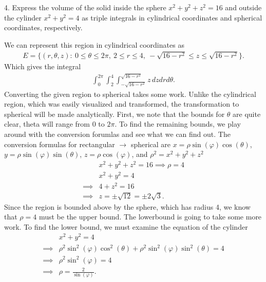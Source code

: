 \documentclass{report}
\begin{document}
    \bigbreak \noindent 
    \begin{mdframed}
        4. Express the volume of the solid inside the sphere \(x^2 + y^2 + z^2 = 16\) and outside the cylinder \(x^2 + y^2 = 4\) as triple integrals in cylindrical coordinates and spherical coordinates, respectively.
    \end{mdframed}
    \bigbreak \noindent 
    We can represent this region in cylindrical coordinates as
    \begin{align*}
        E = \{(r,\theta ,z):\ 0 \leq \theta \leq 2\pi,\ 2 \leq r \leq 4,\ -\sqrt{16-r^{2}} \leq z \leq \sqrt{16-r^{2}}\}
    .\end{align*}
    Which gives the integral
    \begin{align*}
        \int_{0}^{2\pi }\int_{2}^{4}\int_{-\sqrt{16-r^{2}}}^{\sqrt{16-r^{2}}}  z\,dzdrd\theta  
    .\end{align*}
    \bigbreak \noindent 
    Converting the given region to spherical takes some work. Unlike the cylindrical region, which was easily visualized and transformed, the transformation to spherical will be made analytically.
    \bigbreak \noindent 
    First, we note that the bounds for $\theta$ are quite clear, theta will range from $0$ to $2\pi$. To find the remaining bounds, we play around with the conversion forumlas and see what we can find out. The conversion formulas for rectangular $\rightarrow$ spherical are $x=\rho\sin{\left(\varphi\right)}\cos{\left(\theta \right)} $, $y=\rho\sin{\left(\varphi\right)}\sin{\left(\theta \right)} $, $z=\rho\cos{\left(\varphi\right)} $, and $\rho^{2} = x^{2} + y^{2} + z^{2}$
    \begin{align*}
        &x^{2} + y^{2} + z^{2} = 16 \implies \rho = 4\\
        &x^{2} + y^{2} = 4 \\
        \implies &4 + z^{2} = 16  \\
        \implies &z = \pm \sqrt{12} = \pm 2\sqrt{3}
    .\end{align*}
    \bigbreak \noindent 
    Since the region is bounded above by the sphere, which has radius 4, we know that $\rho = 4$ must be the upper bound. The lowerbound is going to take some more work. To find the lower bound, we must examine the equation of the cylinder 
    \begin{align*}
        &x^{2} + y^{2} = 4 \\
        \implies & \rho^{2}\sin^{2}{\left(\varphi\right)}\cos^{2}{\left(\theta \right)} + \rho^{2}\sin^{2}{\left(\varphi\right)}\sin^{2}{\left(\theta \right)} = 4 \\
        \implies & \rho^{2}\sin^{2}{\left(\varphi\right)} =4 \\
        \implies & \rho = \frac{2}{\sin{\left(\varphi\right)}}
    .\end{align*}
\end{document}
